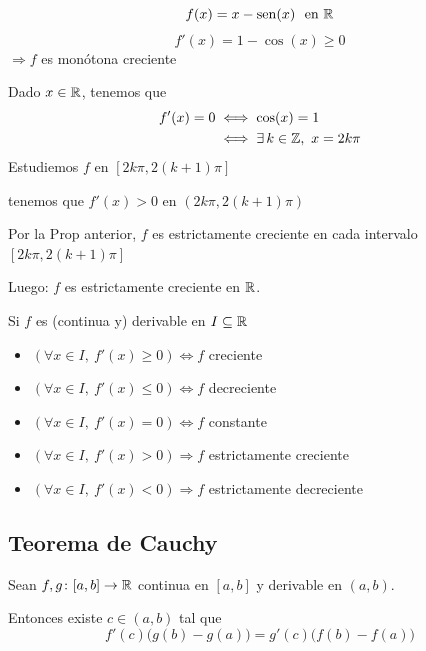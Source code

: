 \documentclass[11pt,a4paper]{article}
\begin{document}
\begin{ejemplo}
  \[
    f(x)=x-\operatorname{sen}(x)\ \text{ en } \mathbb{R}
  \]
  \[
    f'(x)=1-\cos(x)\geq 0
  \]
  $\Rightarrow f$ es monótona creciente

  Dado $x\in\mathbb{R}$, tenemos que
  \begin{align*}
    f'(x)=0&\iff\cos(x)=1\\
    &\iff\exists\,k\in\mathbb{Z},\ x=2k\pi
  \end{align*}
  Estudiemos $f$ en $[2k\pi,2(k+1)\pi]$

  tenemos que $f'(x)>0$ en $(2k\pi,2(k+1)\pi)$

  Por la Prop anterior, $f$ es estrictamente creciente en cada intervalo
  $[2k\pi,2(k+1)\pi]$

  Luego: $f$ es estrictamente creciente en $\mathbb{R}$.

  \begin{center}
  \end{center}
\end{ejemplo}

\begin{corolario}
  Si $f$ es (continua y) derivable en $I\subseteq\mathbb{R}$
  \begin{itemize}
    \item $(\forall x\in I,\ f'(x)\geq 0)\iff f$ creciente
    \item $(\forall x\in I,\ f'(x)\leq 0)\iff f$ decreciente
    \item $(\forall x\in I,\ f'(x)=0)\iff f$ constante
    \item $(\forall x\in I,\ f'(x)>0)\Rightarrow f$ estrictamente creciente
    \item $(\forall x\in I,\ f'(x)<0)\Rightarrow f$ estrictamente decreciente
  \end{itemize}
\end{corolario}

\subsection{Teorema de Cauchy}

\begin{teorema}[Cauchy]
  Sean $f,g\colon[a,b]\to\mathbb{R}$ continua en $[a,b]$ y derivable en $(a,b)$.

  Entonces existe $c\in(a,b)$ tal que
  \[
    f'(c)\bigl(g(b)-g(a)\bigr)=g'(c)\bigl(f(b)-f(a)\bigr)
  \]
\end{teorema}
\end{document}
